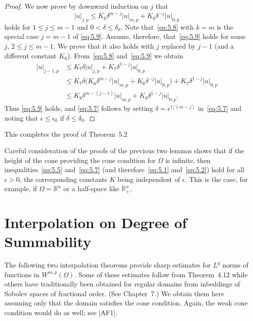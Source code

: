 \begin{proof}
  We now prove by downward induction on $j$ that
  \begin{equation}\label{eq:5.9}
    |u|_{j,p} \leq K_6 \delta^{m-j} |u|_{m,p} + K_6 \delta^{-j} |u|_{0,p}
  \end{equation}
  holds for $1\leq j\leq m-1$ and $0<\delta\leq\delta_0$.
  Note that~\eqref{eq:5.8} with $k=m$ is the special case $j=m-1$
  of \eqref{eq:5.9}. Assume, therefore, that~\eqref{eq:5.9} holds for
  some $j$, $2\leq j\leq m-1$. We prove that it also holds with $j$
  replaced by $j-1$ (and a different constant $K_6$).
  From~\eqref{eq:5.8} and~\eqref{eq:5.9} we obtain
  \begin{align*}
    |u|_{j-1,p}
    & \leq K_7 \delta |u|_{j,p} + K_7 \delta^{1-j} |u|_{0,p} \\
    & \leq K_7 \delta \bigl(K_6 \delta^{m-j}|u|_{m,p}
      + K_6 \delta^{-j} |u|_{0,p}\bigr) + K_7 \delta^{1-j} |u|_{0,p} \\
    & \leq K_8 \delta^{m-(j-1)} |u|_{m,p} + K_8 \delta^{1-j} |u|_{0,p}.
  \end{align*}
  Thus \eqref{eq:5.9} holds, and \eqref{eq:5.7} follows by setting
  $\delta = \epsilon^{1/(m-j)}$ in~\eqref{eq:5.7} and noting that
  $\epsilon\leq\epsilon_0$ if $\delta\leq\delta_0$.
\end{proof}

This completes the proof of Theorem~5.2

\begin{remark}
  Careful consideration of the proofs of the previous two lemmas
  shows that if the height of the cone providing the cone condition
  for $\Omega$ is infinite, then inequalities~\eqref{eq:5.5}
  and~\eqref{eq:5.7} (and therefore~\eqref{eq:5.1} and~\eqref{eq:5.2})
  hold for all $\epsilon>0$, the corresponding constants $K$
  being independent of $\epsilon$. This is the case, for example,
  if $\Omega=\mathbb{R}^n$ or a half-space like $\mathbb{R}^n_+$.
\end{remark}


\section{Interpolation on Degree of Summability}

The following two interpolation theorems provide sharp estimates
for $L^q$ norms of functions in $W^{m,p}(\Omega)$. Some of these
estimates follow from Theorem~4.12 while others have traditionally
been obtained for regular domains from inbeddings of Sobolev
spaces of fractional order. (See Chapter~7.) We obtain them here
assuming only that the domain satisfies the cone condition. Again,
the weak cone condition would do as well; see [AF1].

